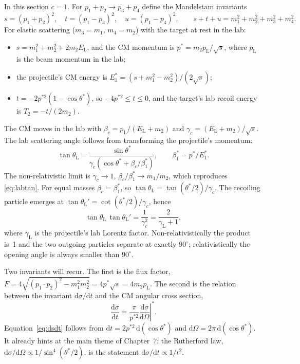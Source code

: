 \documentclass[11pt,a4paper]{book}
\numberwithin{equation}{chapter}
\newcommand{\dd}{\mathrm{d}}
\newcommand{\dsdO}{\frac{\dd\sigma}{\dd\Omega}}
\begin{document}
In this section $c=1$. For $p_1+p_2\to p_3+p_4$ define the Mandelstam
invariants
\begin{equation}\label{eq:mandelstam}
  s=(p_1+p_2)^2,\quad t=(p_1-p_3)^2,\quad u=(p_1-p_4)^2,\qquad
  s+t+u=m_1^2+m_2^2+m_3^2+m_4^2 .
\end{equation}
For elastic scattering ($m_3=m_1$, $m_4=m_2$) with the target at rest in the
lab:
\begin{itemize}
  \item $s=m_1^2+m_2^2+2m_2E_{\mathrm L}$, and the CM momentum is
        $p^*=m_2p_{\mathrm L}/\sqrt s$, where $p_{\mathrm L}$ is the beam
        momentum in the lab;
  \item the projectile's CM energy is $E_1^*=(s+m_1^2-m_2^2)/(2\sqrt s)$;
  \item $t=-2p^{*2}(1-\cos\theta^*)$, so $-4p^{*2}\le t\le 0$, and the target's
        lab recoil energy is $T_2=-t/(2m_2)$.
\end{itemize}
The CM moves in the lab with $\beta_c=p_{\mathrm L}/(E_{\mathrm L}+m_2)$ and
$\gamma_c=(E_{\mathrm L}+m_2)/\sqrt s$. The lab scattering angle follows from
transforming the projectile's momentum:
\begin{equation}\label{eq:lab-rel}
  \tan\theta_{\mathrm L}=\frac{\sin\theta^*}
        {\gamma_c\left(\cos\theta^*+\beta_c/\beta_1^*\right)},
  \qquad \beta_1^*=p^*/E_1^* .
\end{equation}
The non-relativistic limit is $\gamma_c\to1$, $\beta_c/\beta_1^*\to m_1/m_2$,
which reproduces \eqref{eq:labtan}. For equal masses $\beta_c=\beta_1^*$, so
$\tan\theta_{\mathrm L}=\tan(\theta^*/2)/\gamma_c$. The recoiling particle
emerges at $\tan\theta_{\mathrm L}'=\cot(\theta^*/2)/\gamma_c$, hence
\begin{equation}\label{eq:product}
  \tan\theta_{\mathrm L}\,\tan\theta_{\mathrm L}'=\frac1{\gamma_c^2}
  =\frac{2}{\gamma_{\mathrm L}+1},
\end{equation}
where $\gamma_{\mathrm L}$ is the projectile's lab Lorentz factor.
Non-relativistically the product is~1 and the two outgoing particles separate
at exactly $90^\circ$; relativistically the opening angle is always smaller
than $90^\circ$.

Two invariants will recur. The first is the flux factor,
$F=4\sqrt{(p_1\!\cdot\! p_2)^2-m_1^2m_2^2}=4p^*\sqrt s=4m_2p_{\mathrm L}$. The
second is the relation between the invariant $\dd\sigma/\dd t$ and the CM
angular cross section,
\begin{equation}\label{eq:dsdt}
  \frac{\dd\sigma}{\dd t}=\frac{\pi}{p^{*2}}\left.\dsdO\right|^{*}.
\end{equation}
Equation~\eqref{eq:dsdt} follows from $\dd t=2p^{*2}\,\dd(\cos\theta^*)$ and
$\dd\Omega=2\pi\,\dd(\cos\theta^*)$. It already hints at the main theme of
Chapter~7: the Rutherford law, $\dd\sigma/\dd\Omega\propto1/\sin^4(\theta^*/2)$,
is the statement $\dd\sigma/\dd t\propto1/t^2$.
\end{document}
